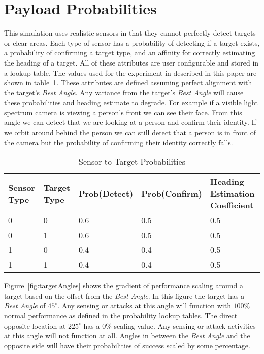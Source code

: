 \section{Payload Probabilities}
\label{sec:payload_probs}
This simulation uses realistic sensors in that they cannot perfectly detect targets or clear areas.  Each type of sensor has a probability of detecting if a target exists, a probability of confirming a target type, and an affinity for correctly estimating the heading of a target.  All of these attributes are user configurable and stored in a lookup table.  The values used for the experiment in described in this paper are shown in table~\ref{tab:snsrTgtProb}.  These attributes are defined assuming perfect alignment with the target's \textit{Best Angle}.  Any variance from the target's \textit{Best Angle} will cause these probabilities and heading estimate to degrade.  For example if a visible light spectrum camera is viewing a person's front we can see their face.  From this angle we can detect that we are looking at a person and confirm their identity.  If we orbit around behind the person we can still detect that a person is in front of the camera but the probability of confirming their identity correctly falls.

\begin{table}[H]
	\caption{Sensor to Target Probabilities}
	\centering
	\label{tab:snsrTgtProb}
	\begin{tabular}{|p{1cm}|p{1cm}|p{1cm}|p{1cm}|p{1cm}|}
		\hline
		Sensor Type & Target Type & Prob(Detect) & Prob(Confirm) & Heading Estimation Coefficient\\ \hline
		0 & 0 & 0.6 & 0.5 & 0.5 \\
		0 & 1 & 0.6 & 0.5 & 0.5 \\
		1 & 0 & 0.4 & 0.4 & 0.5 \\
		1 & 1 & 0.4 & 0.4 & 0.5 \\
		\hline
	\end{tabular}
\end{table}

Figure~\ref{fig:targetAngles} shows the gradient of performance scaling around a target based on the offset from the \textit{Best Angle}.  In this figure the target has a \textit{Best Angle} of $45^{\circ}$.  Any sensing or attacks at this angle will function with $100\%$ normal performance as defined in the probability lookup tables.  The direct opposite location at $225^{\circ}$ has a $0\%$ scaling value.  Any sensing or attack activities at this angle will not function at all.  Angles in between the \textit{Best Angle} and the opposite side will have their probabilities of success scaled by some percentage.

